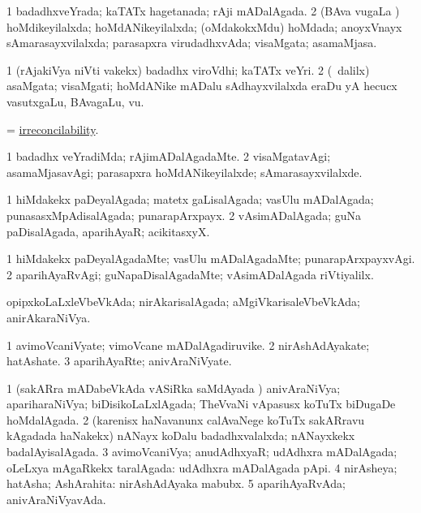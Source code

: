 \bentry
{}
\gl{\gu}
\bmng
\bnum
\num{1} badadhxveYrada; kaTATx hagetanada; rAji mADalAgada. 
\num{2} (BAva \mo vugaLa \vi) hoMdikeyilalxda; hoMdANikeyilalxda; (oMdakokxMdu) hoMdada; anoyxVnayx sAmarasayxvilalxda; parasapxra virudadhxvAda; visaMgata; asamaMjasa. 
\enum
\emng
\eentry

\bentry
{}
\gl{\nA}
\bmng
\bnum
\num{1} (rAjakiVya niVti \mo vakekx) badadhx viroVdhi; kaTATx veYri. 
\num{2} (\sA\ \bava dalilx) asaMgata; visaMgati; hoMdANike mADalu sAdhayxvilalxda eraDu yA hecucx vasutxgaLu, BAvagaLu, \mo vu. 
\enum
\emng
\eentry

\bentry
{}
\gl{\nA}
\bmng
= \hyperlink{irreconcilability}{irreconcilability}. 
\emng
\eentry

\bentry
{}
\gl{\kirxvi}
\bmng
\bnum
\num{1} badadhx veYradiMda; rAjimADalAgadaMte. 
\num{2} visaMgatavAgi; asamaMjasavAgi; parasapxra hoMdANikeyilalxde; sAmarasayxvilalxde. 
\enum
\emng
\eentry

\bentry
{}
\gl{\gu}
\bmng
\bnum
\num{1} hiMdakekx paDeyalAgada; matetx gaLisalAgada; vasUlu mADalAgada; punasasxMpAdisalAgada; punarapArxpayx. 
\num{2} vAsimADalAgada; guNa paDisalAgada, aparihAyaR; acikitasxyX. 
\enum
\emng
\eentry

\bentry
{}
\gl{\kirxvi}
\bmng
\bnum
\num{1} hiMdakekx paDeyalAgadaMte; vasUlu mADalAgadaMte; punarapArxpayxvAgi. 
\num{2} aparihAyaRvAgi; guNapaDisalAgadaMte; vAsimADalAgada riVtiyalilx. 
\enum
\emng
\eentry

\bentry
{}
\gl{\gu}
\bmng
opipxkoLaLxleVbeVkAda; nirAkarisalAgada; aMgiVkarisaleVbeVkAda; anirAkaraNiVya. 
\emng
\eentry

\bentry
{}
\gl{\nA}
\bmng
\bnum
\num{1} avimoVcaniVyate; vimoVcane mADalAgadiruvike. 
\num{2} nirAshAdAyakate; hatAshate. 
\num{3} aparihAyaRte; anivAraNiVyate. 
\enum
\emng
\eentry

\bentry
{}
\gl{\gu}
\bmng
\bnum
\num{1} (sakARra mADabeVkAda vASiRka saMdAyada \vi) anivAraNiVya; apariharaNiVya; biDisikoLaLxlAgada; TheVvaNi vApasusx koTuTx biDugaDe hoMdalAgada. 
\num{2} (karenisx haNavanunx calAvaNege koTuTx sakARravu kAgadada haNakekx) nANayx koDalu badadhxvalalxda; nANayxkekx badalAyisalAgada. 
\num{3} avimoVcaniVya; anudAdhxyaR; udAdhxra mADalAgada; oLeLxya mAgaRkekx taralAgada:  udAdhxra mADalAgada pApi. 
\num{4} nirAsheya; hatAsha; AshArahita:  nirAshAdAyaka mabubx. 
\num{5} aparihAyaRvAda; anivAraNiVyavAda. 
\enum
\emng
\eentry

